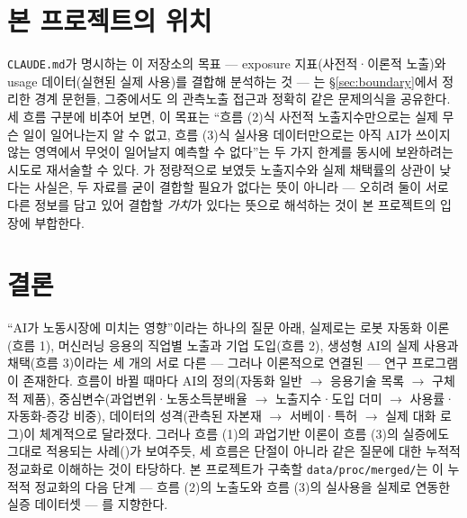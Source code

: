 \documentclass[11pt]{article}
\begin{document}
\section{본 프로젝트의 위치}
\label{sec:position}

\texttt{CLAUDE.md}가 명시하는 이 저장소의 목표 — exposure 지표(사전적·이론적 노출)와 usage 데이터(실현된 실제 사용)를 결합해 분석하는 것 — 는 \S\ref{sec:boundary}에서 정리한 경계 문헌들, 그중에서도 \textcite{massenkoff-2026-labor-market-impacts-of-ai}의 관측노출 접근과 정확히 같은 문제의식을 공유한다. 세 흐름 구분에 비추어 보면, 이 목표는 ``흐름 (2)식 사전적 노출지수만으로는 실제 무슨 일이 일어나는지 알 수 없고, 흐름 (3)식 실사용 데이터만으로는 아직 AI가 쓰이지 않는 영역에서 무엇이 일어날지 예측할 수 없다''는 두 가지 한계를 동시에 보완하려는 시도로 재서술할 수 있다. \textcite{bick-2026-what-work-does-generative}가 정량적으로 보였듯 노출지수와 실제 채택률의 상관이 낮다는 사실은, 두 자료를 굳이 결합할 필요가 없다는 뜻이 아니라 — 오히려 둘이 서로 다른 정보를 담고 있어 결합할 \emph{가치}가 있다는 뜻으로 해석하는 것이 본 프로젝트의 입장에 부합한다.

\section{결론}

``AI가 노동시장에 미치는 영향''이라는 하나의 질문 아래, 실제로는 로봇 자동화 이론(흐름 1), 머신러닝 응용의 직업별 노출과 기업 도입(흐름 2), 생성형 AI의 실제 사용과 채택(흐름 3)이라는 세 개의 서로 다른 — 그러나 이론적으로 연결된 — 연구 프로그램이 존재한다. 흐름이 바뀔 때마다 AI의 정의(자동화 일반 $\to$ 응용기술 목록 $\to$ 구체적 제품), 중심변수(과업변위·노동소득분배율 $\to$ 노출지수·도입 더미 $\to$ 사용률·자동화-증강 비중), 데이터의 성격(관측된 자본재 $\to$ 서베이·특허 $\to$ 실제 대화 로그)이 체계적으로 달라졌다. 그러나 흐름 (1)의 과업기반 이론이 흐름 (3)의 실증에도 그대로 적용되는 사례(\cite{acemoglu-2024-the-simple-macroeconomics-of-ai})가 보여주듯, 세 흐름은 단절이 아니라 같은 질문에 대한 누적적 정교화로 이해하는 것이 타당하다. 본 프로젝트가 구축할 \texttt{data/proc/merged/}는 이 누적적 정교화의 다음 단계 — 흐름 (2)의 노출도와 흐름 (3)의 실사용을 실제로 연동한 실증 데이터셋 — 를 지향한다.

\appendix
\end{document}
